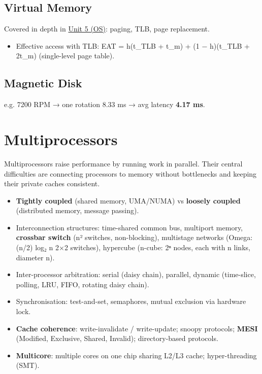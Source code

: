 \needspace{125pt}

\hypertarget{p2-02--92-virtual-memory}{%
\subsection{Virtual Memory}\label{p2-02--92-virtual-memory}}

Covered in depth in \protect\hyperlink{p2-05}{Unit 5 (OS)}: paging, TLB, page replacement.

\begin{itemize}
\tightlist
\item
  Effective access with TLB: EAT = h(t\_TLB + t\_m) + (1 − h)(t\_TLB + 2t\_m) (single-level page table).
\end{itemize}

\needspace{95pt}

\hypertarget{p2-02--93-magnetic-disk}{%
\subsection{Magnetic Disk}\label{p2-02--93-magnetic-disk}}



e.g. 7200 RPM → one rotation 8.33 ms → avg latency \textbf{4.17 ms}.

\needspace{125pt}

\hypertarget{p2-02--10-multiprocessors}{%
\section{Multiprocessors}\label{p2-02--10-multiprocessors}}

Multiprocessors raise performance by running work in parallel. Their central difficulties are connecting
processors to memory without bottlenecks and keeping their private caches consistent.

\begin{itemize}
\tightlist
\item
  \textbf{Tightly coupled} (shared memory, UMA/NUMA) vs \textbf{loosely coupled} (distributed memory, message passing).
\item
  Interconnection structures: time-shared common bus, multiport memory, \textbf{crossbar switch} (n² switches, non-blocking), multistage networks (Omega: (n/2) log₂ n 2×2 switches), hypercube (n-cube: 2ⁿ nodes, each with n links, diameter n).
\item
  Inter-processor arbitration: serial (daisy chain), parallel, dynamic (time-slice, polling, LRU, FIFO, rotating daisy chain).
\item
  Synchronisation: test-and-set, semaphores, mutual exclusion via hardware lock.
\item
  \textbf{Cache coherence}: write-invalidate / write-update; snoopy protocols; \textbf{MESI} (Modified, Exclusive, Shared, Invalid); directory-based protocols.
\item
  \textbf{Multicore}: multiple cores on one chip sharing L2/L3 cache; hyper-threading (SMT).
\end{itemize}


